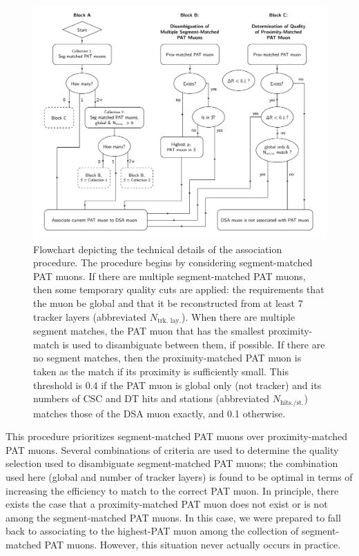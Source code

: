 \begin{figure}[p]
  \centering
  \includegraphics[width=\textwidth]{figures/displaced/ReplacementDiagram.pdf}
  \caption[Flowchart depicting the technical details of the \DSAToPAT association procedure]{Flowchart depicting the technical details of the \DSAToPAT association procedure. The procedure begins by considering segment-matched PAT muons. If there are multiple segment-matched PAT muons, then some temporary quality cuts are applied: the requirements that the muon be global and that it be reconstructed from at least 7 tracker layers (abbreviated $N_\text{trk. lay.}$). When there are multiple segment matches, the PAT muon that has the smallest proximity-match \deltaR is used to disambiguate between them, if possible. If there are no segment matches, then the proximity-matched PAT muon is taken as the match if its proximity \deltaR is sufficiently small. This threshold is 0.4 if the PAT muon is global only (not tracker) and its numbers of CSC and DT hits and stations (abbreviated $N_\text{hits./st.}$) matches those of the DSA muon exactly, and 0.1 otherwise.}
  \label{fig:dd:repdiagram}
\end{figure}

This procedure prioritizes segment-matched PAT muons over proximity-matched PAT muons.
Several combinations of criteria are used to determine the quality selection used to disambiguate segment-matched PAT muons; the combination used here (global and number of tracker layers) is found to be optimal in terms of increasing the efficiency to match to the correct PAT muon.
In principle, there exists the case that a proximity-matched PAT muon does not exist or is not among the segment-matched PAT muons.
In this case, we were prepared to fall back to associating to the highest-\pT PAT muon among the collection of segment-matched PAT muons.
However, this situation never actually occurs in practice.

